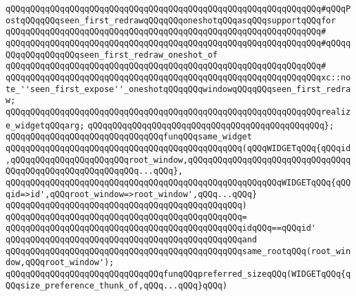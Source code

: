 \newline
\verb|qQQqqQQqqQQqqQQqqQQqqQQqqQQqqQQqqQQqqQQqqQQqqQQqqQQqqQQqqQQqqQQq#qQQqPostqQQqqQQqseen_first_redrawqQQqqQQqoneshotqQQqasqQQqsupportqQQqfor|\newline
\verb|qQQqqQQqqQQqqQQqqQQqqQQqqQQqqQQqqQQqqQQqqQQqqQQqqQQqqQQqqQQqqQQq#|\newline
\verb|qQQqqQQqqQQqqQQqqQQqqQQqqQQqqQQqqQQqqQQqqQQqqQQqqQQqqQQqqQQqqQQq#qQQqqQQqqQQqqQQqqQQqseen_first_redraw_oneshot_of|\newline
\verb|qQQqqQQqqQQqqQQqqQQqqQQqqQQqqQQqqQQqqQQqqQQqqQQqqQQqqQQqqQQqqQQq#|\newline
\verb|qQQqqQQqqQQqqQQqqQQqqQQqqQQqqQQqqQQqqQQqqQQqqQQqqQQqqQQqqQQqqQQqxc::note_''seen_first_expose''_oneshotqQQqqQQqwindowqQQqqQQqseen_first_redraw;|\newline
\newline
\verb|qQQqqQQqqQQqqQQqqQQqqQQqqQQqqQQqqQQqqQQqqQQqqQQqqQQqqQQqqQQqqQQqrealize_widgetqQQqarg;|\newline
\verb|qQQqqQQqqQQqqQQqqQQqqQQqqQQqqQQqqQQqqQQqqQQqqQQq};|\newline
\newline
\newline
\verb|qQQqqQQqqQQqqQQqqQQqqQQqqQQqqQQqfunqQQqsame_widget|\newline
\verb|qQQqqQQqqQQqqQQqqQQqqQQqqQQqqQQqqQQqqQQqqQQqqQQq(qQQqWIDGETqQQq{qQQqid,qQQqqQQqqQQqqQQqqQQqqQQqroot_window,qQQqqQQqqQQqqQQqqQQqqQQqqQQqqQQqqQQqqQQqqQQqqQQqqQQqqQQqqQQq...qQQq},|\newline
\verb|qQQqqQQqqQQqqQQqqQQqqQQqqQQqqQQqqQQqqQQqqQQqqQQqqQQqqQQqWIDGETqQQq{qQQqid=>id',qQQqroot_window=>root_window',qQQq...qQQq}|\newline
\verb|qQQqqQQqqQQqqQQqqQQqqQQqqQQqqQQqqQQqqQQqqQQqqQQq)|\newline
\verb|qQQqqQQqqQQqqQQqqQQqqQQqqQQqqQQqqQQqqQQqqQQqqQQq=|\newline
\verb|qQQqqQQqqQQqqQQqqQQqqQQqqQQqqQQqqQQqqQQqqQQqqQQqidqQQq==qQQqid'|\newline
\verb|qQQqqQQqqQQqqQQqqQQqqQQqqQQqqQQqqQQqqQQqqQQqqQQqand|\newline
\verb|qQQqqQQqqQQqqQQqqQQqqQQqqQQqqQQqqQQqqQQqqQQqqQQqsame_rootqQQq(root_window,qQQqroot_window');|\newline
\newline
\newline
\verb|qQQqqQQqqQQqqQQqqQQqqQQqqQQqqQQqfunqQQqpreferred_sizeqQQq(WIDGETqQQq{qQQqsize_preference_thunk_of,qQQq...qQQq}qQQq)|\newline
